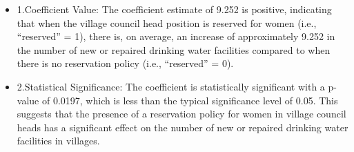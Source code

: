 \documentclass[12pt,letterpaper]{article}
\begin{document}
\begin{enumerate}
\begin{itemize}
		\begin{itemize}
			\item 1.Coefficient Value: The coefficient estimate of 9.252 is positive, indicating that when the village council head position is reserved for women (i.e., “reserved” = 1), there is, on average, an increase of approximately 9.252 in the number of new or repaired drinking water facilities compared to when there is no reservation policy (i.e., “reserved” = 0).
	        \item 2.Statistical Significance: The coefficient is statistically significant with a p-value of 0.0197, which is less than the typical significance level of 0.05. This suggests that the presence of a reservation policy for women in village council heads has a significant effect on the number of new or repaired drinking water facilities in villages.
	    \end{itemize}
	\end{itemize}
\end{enumerate}
\end{document}
